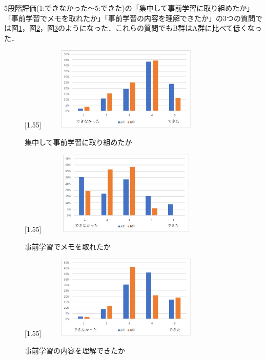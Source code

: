 \documentclass[a4j,11pt]{jsarticle}
\begin{document}
5段階評価(1:できなかった〜5:できた)の「集中して事前学習に取り組めたか」「事前学習でメモを取れたか」「事前学習の内容を理解できたか」の3つの質問では図\ref{anke2}，図\ref{anke3}，図\ref{anke4}のようになった．これらの質問でもB群はA群に比べて低くなった．


\begin{figure}[h]
\begin{center}
\scalebox{1.2}[1.55]{
 \includegraphics[clip,width=85mm,height=40mm]{anke2.pdf}
 }
\end{center}
 \caption{集中して事前学習に取り組めたか}
 \label{anke2}
\end{figure}

\newpage


\begin{figure}[h]
\begin{center}
\scalebox{1.2}[1.55]{
 \includegraphics[clip,width=85mm,height=40mm]{anke3.pdf}
 }
\end{center}
 \caption{事前学習でメモを取れたか}
 \label{anke3}
\end{figure}


\begin{figure}[h]
\begin{center}
\scalebox{1.2}[1.55]{
 \includegraphics[clip,width=85mm,height=40mm]{anke4.pdf}
 }
\end{center}
 \caption{事前学習の内容を理解できたか}
 \label{anke4}
\end{figure}
\end{document}
